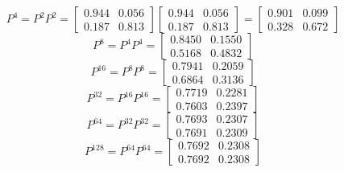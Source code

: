 \documentclass[notes=show]{beamer}
\begin{document}
\begin{frame}%

%
\[
P^{4}=P^{2}P^{2}=\left[ 
\begin{array}{cc}
0.944 & 0.056 \\ 
0.187 & 0.813%
\end{array}%
\right] \left[ 
\begin{array}{cc}
0.944 & 0.056 \\ 
0.187 & 0.813%
\end{array}%
\right] =\left[ 
\begin{array}{cc}
0.901 & 0.099 \\ 
0.328 & 0.672%
\end{array}%
\right] 
\]%
\[
P^{8}=P^{4}P^{4}=\left[ 
\begin{array}{cc}
0.8450 & 0.1550 \\ 
0.5168 & 0.4832%
\end{array}%
\right] 
\]%
\[
P^{16}=P^{8}P^{8}=\left[ 
\begin{array}{cc}
0.7941 & 0.2059 \\ 
0.6864 & 0.3136%
\end{array}%
\right] 
\]%
\[
P^{32}=P^{16}P^{16}=\left[ 
\begin{array}{cc}
0.7719 & 0.2281 \\ 
0.7603 & 0.2397%
\end{array}%
\right] 
\]%
\[
P^{64}=P^{32}P^{32}=\left[ 
\begin{array}{cc}
0.7693 & 0.2307 \\ 
0.7691 & 0.2309%
\end{array}%
\right] 
\]%
\[
P^{128}=P^{64}P^{64}=\left[ 
\begin{array}{cc}
0.7692 & 0.2308 \\ 
0.7692 & 0.2308%
\end{array}%
\right] 
\]

\end{frame}%
\end{document}
